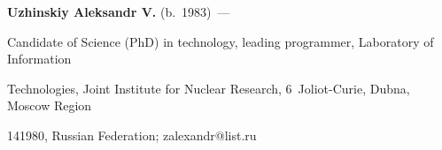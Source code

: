 \vspace*{4pt}





\noindent


\textbf{Uzhinskiy Aleksandr V.} (b.\ 1983)~---


Candidate of Science (PhD) in technology, leading programmer, Laboratory of Information


Technologies,  Joint Institute for Nuclear Research, 6~Joliot-Curie, Dubna, Moscow Region


141980, Russian Federation; zalexandr@list.ru


 \label{end\stat}








\renewcommand{\bibname}{\protect\rm Литература}


